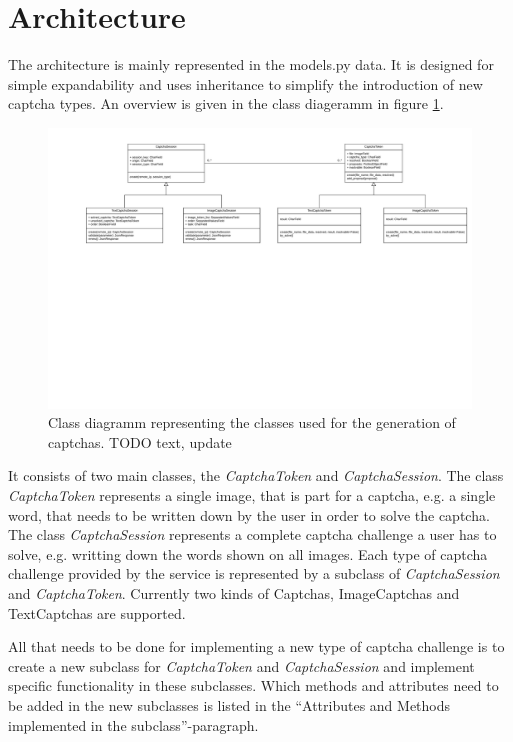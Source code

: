 \section{Architecture}
\label{sec:architecture}

The architecture is mainly represented in the models.py data. It is designed for simple expandability and uses inheritance to simplify the introduction of new captcha types.  An overview is given in the class diageramm in figure \ref{fig:classdia}. 

\begin{figure}[!h]
\centering
\includegraphics[width=1.5\linewidth]{content/figures/classdiagramm.png}
\caption{Class diagramm representing the classes used for the generation of captchas. TODO text, update
}
\label{fig:classdia}
\end{figure}

It consists of two main classes, the \emph{CaptchaToken} and \emph{CaptchaSession}. The class \emph{CaptchaToken} represents a single image, that is part for a captcha, e.g. a single word, that needs to be written down by the user in order to solve the captcha. The class \emph{CaptchaSession} represents a complete captcha challenge a user has to solve, e.g. writting down the words shown on all images. Each type of captcha challenge provided by the service is represented by a subclass of \emph{CaptchaSession} and \emph{CaptchaToken}. Currently two kinds of Captchas, ImageCaptchas and TextCaptchas are supported.


All that needs to be done for implementing a new type of captcha challenge is to create a new subclass for \emph{CaptchaToken} and \emph{CaptchaSession} and implement specific functionality in these subclasses. Which methods and attributes need to be added in the new subclasses is listed in the ``Attributes and Methods implemented in the subclass''-paragraph.



